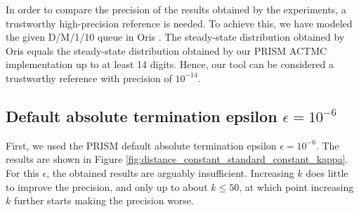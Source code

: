 \documentclass{article}
\numberwithin{equation}{section}		%
\numberwithin{figure}{section}			%
\numberwithin{table}{section}				%
\begin{document}
	 
	 In order to compare the precision of the results obtained by the experiments, a trustworthy high-precision reference is needed. To achieve this, we have modeled the given D/M/1/10 queue in Oris \cite{Bucci2010}. The steady-state distribution obtained by Oris equals the steady-state distribution obtained by our PRISM ACTMC implementation up to at least 14 digits. Hence, our tool can be considered a trustworthy reference with precision of $10^{-14}$.
	
	\subsection{Default absolute termination epsilon $\epsilon = 10^{-6}$}
	\label{default_absolute}
	
	First, we used the PRISM default absolute termination epsilon $\epsilon = 10^{-6}$. The results are shown in Figure \ref{fig:distance_constant_standard_constant_kappa}. For this $\epsilon$, the obtained results are arguably insufficient. Increasing $k$ does little to improve the precision, and only up to about $k \leq 50$, at which point increasing $k$ further starts making the precision worse.
	
\end{document}
